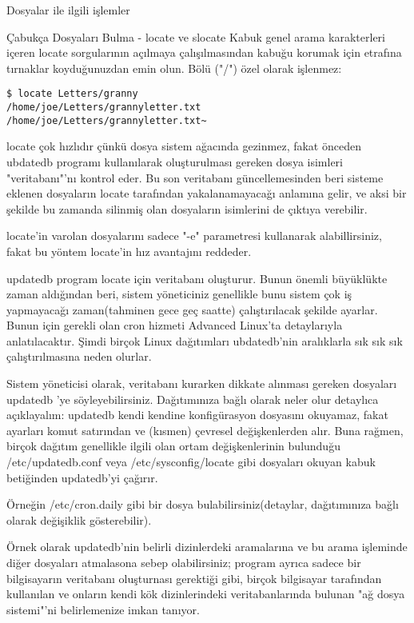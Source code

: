 \documentclass[10pt,a5paper]{book}
\begin{document}
\begin{section}{Dosyalar ile ilgili işlemler}
\begin{subsection}{Çabukça Dosyaları Bulma - locate ve slocate}
Kabuk genel arama karakterleri içeren locate sorgularının açılmaya çalışılmasından kabuğu korumak için etrafına tırnaklar koyduğunuzdan emin olun.
Bölü ("/") özel olarak işlenmez:
\begin{verbatim}
$ locate Letters/granny
/home/joe/Letters/grannyletter.txt
/home/joe/Letters/grannyletter.txt~
\end{verbatim}

locate çok hızlıdır çünkü dosya sistem ağacında gezinmez, fakat önceden ubdatedb programı kullanılarak oluşturulması gereken dosya isimleri "veritabanı"'nı kontrol eder. Bu son veritabanı güncellemesinden beri sisteme eklenen dosyaların locate tarafından yakalanamayacağı anlamına gelir, ve aksi bir şekilde bu zamanda silinmiş olan dosyaların isimlerini de çıktıya verebilir.

locate'in varolan dosyalarını sadece "-e" parametresi kullanarak alabillirsiniz, fakat bu yöntem locate'in hız avantajını reddeder.

updatedb program locate için veritabanı oluşturur. Bunun önemli büyüklükte zaman aldığından beri, sistem yöneticiniz genellikle bunu sistem çok iş yapmayacağı zaman(tahminen gece geç saatte) çalıştırılacak şekilde ayarlar.
Bunun için gerekli olan cron hizmeti Advanced Linux'ta detaylarıyla anlatılacaktır. Şimdi birçok Linux dağıtımları ubdatedb'nin aralıklarla sık sık sık çalıştırılmasına neden olurlar.

Sistem yöneticisi olarak, veritabanı kurarken dikkate alınması gereken dosyaları updatedb 'ye söyleyebilirsiniz. Dağıtımınıza bağlı olarak neler olur detaylıca açıklayalım: updatedb kendi kendine konfigürasyon dosyasını okuyamaz, fakat ayarları komut satırından ve (kısmen) çevresel değişkenlerden alır. Buna rağmen, birçok dağıtım genellikle ilgili olan ortam değişkenlerinin bulunduğu /etc/updatedb.conf veya /etc/sysconfig/locate gibi dosyaları okuyan kabuk betiğinden updatedb'yi çağırır.

	Örneğin /etc/cron.daily gibi bir dosya bulabilirsiniz(detaylar, dağıtımınıza bağlı olarak değişiklik gösterebilir).
	
	Örnek olarak updatedb'nin belirli dizinlerdeki aramalarına ve bu arama işleminde diğer dosyaları atmalasona sebep olabilirsiniz; program ayrıca sadece bir bilgisayarın veritabanı oluşturnası gerektiği gibi, birçok bilgisayar  tarafından kullanılan ve onların kendi kök dizinlerindeki veritabanlarında bulunan "ağ dosya sistemi"'ni belirlemenize imkan tanıyor.
	

\end{subsection}
\end{section}
\end{document}
